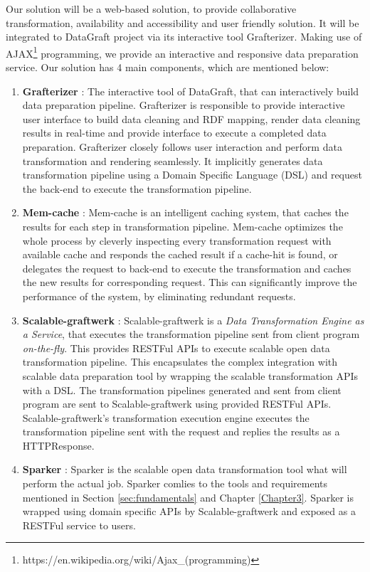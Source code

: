 Our solution will be a web-based solution, to provide collaborative transformation, availability and accessibility and user friendly solution. It will be integrated to DataGraft project via its interactive tool Grafterizer. Making use of AJAX\footnote{https://en.wikipedia.org/wiki/Ajax\_(programming)} programming, we provide an interactive and responsive data preparation service. Our solution has 4 main components, which are mentioned below:
\begin{enumerate}
\item \textbf{Grafterizer} : The interactive tool of DataGraft, that can interactively build data preparation pipeline. Grafterizer is responsible to provide interactive user interface to build data cleaning and RDF mapping,  render data cleaning results in real-time and provide interface to execute a completed data preparation. Grafterizer closely follows  user interaction and perform data transformation and rendering seamlessly. It implicitly generates data transformation pipeline using a Domain Specific Language (DSL) and request the back-end to execute the transformation pipeline. 
\item \textbf{Mem-cache} : Mem-cache is an intelligent caching system, that caches the results for each step in transformation pipeline. Mem-cache optimizes the whole process by cleverly inspecting every transformation request with available cache and responds the cached result if a cache-hit is found, or delegates the request to back-end to execute the transformation and caches the new results for corresponding request. This can significantly improve the performance of the system, by eliminating redundant requests. 
\item \textbf{Scalable-graftwerk} : Scalable-graftwerk is a \textit{Data Transformation Engine as a Service}, that executes the transformation pipeline sent from client program \textit{on-the-fly}. This provides RESTFul \cite{restful} APIs to execute scalable open data transformation pipeline. This encapsulates the complex integration with scalable data preparation tool by wrapping the scalable transformation APIs with a DSL. The transformation pipelines generated and sent from client program are sent to Scalable-graftwerk using provided RESTFul APIs. Scalable-graftwerk's transformation execution engine executes the transformation pipeline sent with the request and replies the results as a HTTPResponse.  
\item \textbf{Sparker} : Sparker is the scalable open data transformation tool what will perform the actual job. Sparker comlies to the tools and requirements mentioned in Section \ref{sec:fundamentals} and Chapter \ref{Chapter3}. Sparker is wrapped using domain specific APIs by Scalable-graftwerk and exposed as a RESTFul service to users. 
\end{enumerate}
